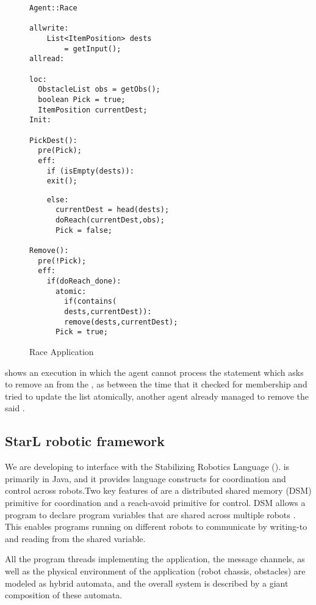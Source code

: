 \begin{figure}[ht!]
\label{fig:Race}
\noindent\begin{minipage}{.5\textwidth}

\begin{lstlisting}
Agent::Race

allwrite:
	List<ItemPosition> dests 
    	= getInput();
allread:

loc:
  ObstacleList obs = getObs();
  boolean Pick = true; 
  ItemPosition currentDest;
Init:

PickDest():
  pre(Pick);
  eff:
    if (isEmpty(dests)):
    exit();   
 \end{lstlisting}
 \end{minipage}\hfill
\noindent\begin{minipage}{.5\textwidth}

\begin{lstlisting}
    else:
      currentDest = head(dests);
      doReach(currentDest,obs);
      Pick = false;
      
Remove():
  pre(!Pick);
  eff:
    if(doReach_done):
      atomic:
        if(contains(
        dests,currentDest)):
        remove(dests,currentDest);
   	  Pick = true;
 \end{lstlisting}
 \end{minipage}\hfill
 \caption{Race Application}
 \end{figure}
 


 shows an execution in which the agent cannot process the statement which asks to remove an  from the , as between the time that it checked for membership and tried to update the list atomically, another agent already managed to remove the said .

\subsection{StarL robotic framework}

We are developing \rolang to interface with the Stabilizing Robotics Language (\StarL). 
\StarL is primarily in Java, and it provides language constructs for coordination and control
across robots.Two key features of \StarL are a distributed shared memory (DSM) primitive
for coordination and a reach-avoid primitive for control. DSM allows a
program to declare program variables that are shared across multiple robots
. This enables programs running on different
robots to communicate by writing-to and reading from the shared variable.

All the program threads implementing the application, the message channels,
as well as the physical environment of the application (robot chassis, obstacles)
are modeled as hybrid automata, and the overall system is described
by a giant composition of these automata. 